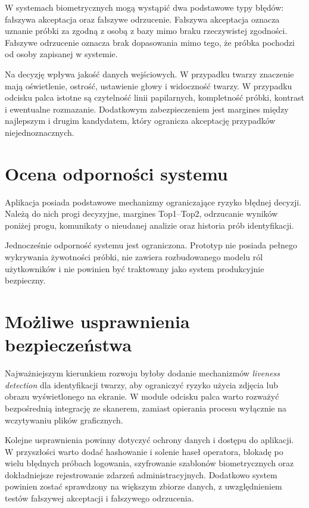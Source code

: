W systemach biometrycznych mogą wystąpić dwa podstawowe typy błędów: fałszywa akceptacja oraz fałszywe odrzucenie. Fałszywa akceptacja oznacza uznanie próbki za zgodną z osobą z bazy mimo braku rzeczywistej zgodności. Fałszywe odrzucenie oznacza brak dopasowania mimo tego, że próbka pochodzi od osoby zapisanej w systemie.

Na decyzję wpływa jakość danych wejściowych. W przypadku twarzy znaczenie mają oświetlenie, ostrość, ustawienie głowy i widoczność twarzy. W przypadku odcisku palca istotne są czytelność linii papilarnych, kompletność próbki, kontrast i ewentualne rozmazanie. Dodatkowym zabezpieczeniem jest margines między najlepszym i drugim kandydatem, który ogranicza akceptację przypadków niejednoznacznych.

\section{Ocena odporności systemu}

Aplikacja posiada podstawowe mechanizmy ograniczające ryzyko błędnej decyzji. Należą do nich progi decyzyjne, margines Top1--Top2, odrzucanie wyników poniżej progu, komunikaty o nieudanej analizie oraz historia prób identyfikacji.

Jednocześnie odporność systemu jest ograniczona. Prototyp nie posiada pełnego wykrywania żywotności próbki, nie zawiera rozbudowanego modelu ról użytkowników i nie powinien być traktowany jako system produkcyjnie bezpieczny.

\section{Możliwe usprawnienia bezpieczeństwa}

Najważniejszym kierunkiem rozwoju byłoby dodanie mechanizmów \textit{liveness detection} dla identyfikacji twarzy, aby ograniczyć ryzyko użycia zdjęcia lub obrazu wyświetlonego na ekranie. W module odcisku palca warto rozważyć bezpośrednią integrację ze skanerem, zamiast opierania procesu wyłącznie na wczytywaniu plików graficznych.

Kolejne usprawnienia powinny dotyczyć ochrony danych i dostępu do aplikacji. W przyszłości warto dodać hashowanie i solenie haseł operatora, blokadę po wielu błędnych próbach logowania, szyfrowanie szablonów biometrycznych oraz dokładniejsze rejestrowanie zdarzeń administracyjnych. Dodatkowo system powinien zostać sprawdzony na większym zbiorze danych, z uwzględnieniem testów fałszywej akceptacji i fałszywego odrzucenia.
